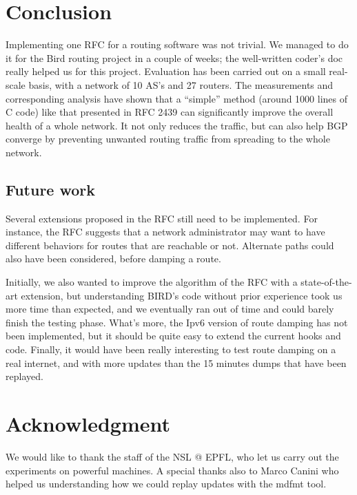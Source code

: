 \documentclass[a4paper,english]{IEEEtran}
\begin{document}
\section{Conclusion}

Implementing one RFC for a routing software was not trivial. We managed to do it for the Bird routing project 
in a couple of weeks; the well-written coder's doc\cite{codersdoc} really helped us for this project.
Evaluation has been carried out on a small real-scale basis, with a network of 10 AS's and 27 routers. 
The measurements and corresponding analysis have shown that a ``simple'' method (around 1000 lines of C code) 
like that presented in RFC 2439 can significantly improve the overall health of a whole network.
It not only reduces the traffic, but can also help BGP converge by preventing unwanted routing traffic from 
spreading to the whole network.

\subsection{Future work}

Several extensions proposed in the RFC still need to be implemented.
For instance, the RFC suggests that a network administrator may want to have different behaviors for routes that 
are reachable or not. Alternate paths could also have been considered, before damping a route.

Initially, we also wanted to improve the algorithm of the RFC with a state-of-the-art extension, but understanding 
BIRD's code without prior experience took us more time than expected, and we eventually ran
out of time and could barely finish the testing phase.
What's more, the Ipv6 version of route damping has not been implemented, but it should be quite easy to extend the current hooks and code.
Finally, it would have been really interesting to test route damping on a real internet, and with more updates
than the 15 minutes dumps that have been replayed.

\section*{Acknowledgment}
We would like to thank the staff of the NSL @ EPFL, who let us carry out the experiments on powerful machines. 
A special thanks also to Marco Canini who helped us understanding how we could replay updates with the mdfmt tool.
\end{document}
